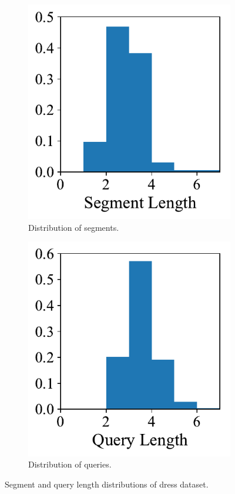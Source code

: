 \begin{figure}
	\centering
	\begin{subfigure}[b]{0.45\columnwidth}
		\centering
		\includegraphics[width=0.8\columnwidth]{figures/data-1.pdf}
		\caption{Distribution of segments.}
		\label{fig:1}
	\end{subfigure}
	\hfill
	\begin{subfigure}[b]{0.45\columnwidth}
		\centering
		\includegraphics[width=0.8\columnwidth]{figures/data-2.pdf}
		\caption{\small Distribution of queries.}
		\label{fig:2}
	\end{subfigure}
	\caption{Segment and query length distributions of dress dataset.}
	\label{fig:12}
\end{figure}



